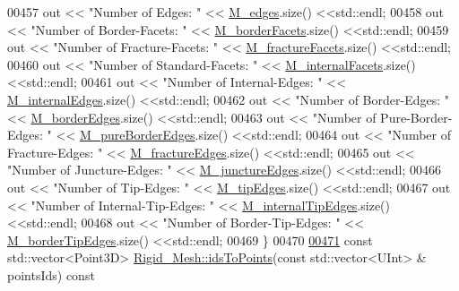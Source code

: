 \begin{DoxyCode}
00457     out << \textcolor{stringliteral}{"Number of Edges: "} << \hyperlink{classFVCode3D_1_1Rigid__Mesh_a4c6287c9256a92c13486048c372fe487}{M\_edges}.size() <<std::endl;
00458     out << \textcolor{stringliteral}{"Number of Border-Facets: "} << \hyperlink{classFVCode3D_1_1Rigid__Mesh_a21700f8c7b816da944a829ee9d3ab7fb}{M\_borderFacets}.size() <<std::endl;
00459     out << \textcolor{stringliteral}{"Number of Fracture-Facets: "} << \hyperlink{classFVCode3D_1_1Rigid__Mesh_acaff9da1f03f04f7012cf372f8f27cd6}{M\_fractureFacets}.size() <<std::endl;
00460     out << \textcolor{stringliteral}{"Number of Standard-Facets: "} << \hyperlink{classFVCode3D_1_1Rigid__Mesh_a8ede7966973fec708327b95fc379a4e1}{M\_internalFacets}.size() <<std::endl;
00461     out << \textcolor{stringliteral}{"Number of Internal-Edges: "} << \hyperlink{classFVCode3D_1_1Rigid__Mesh_a3b689233b2590d76d663195b89d380fb}{M\_internalEdges}.size() <<std::endl;
00462     out << \textcolor{stringliteral}{"Number of Border-Edges: "} << \hyperlink{classFVCode3D_1_1Rigid__Mesh_af9ba7882baec8f8e5e7693a38f3cbc9b}{M\_borderEdges}.size() <<std::endl;
00463     out << \textcolor{stringliteral}{"Number of Pure-Border-Edges: "} << \hyperlink{classFVCode3D_1_1Rigid__Mesh_a72e5bc2acebdc3bca417fa55dfd4c8c0}{M\_pureBorderEdges}.size() <<std::endl;
00464     out << \textcolor{stringliteral}{"Number of Fracture-Edges: "} << \hyperlink{classFVCode3D_1_1Rigid__Mesh_af4626d6b92116a3f6e925847f413da2b}{M\_fractureEdges}.size() <<std::endl;
00465     out << \textcolor{stringliteral}{"Number of Juncture-Edges: "} << \hyperlink{classFVCode3D_1_1Rigid__Mesh_a01850de43f4d5d1dcf617d7697bcf3e8}{M\_junctureEdges}.size() <<std::endl;
00466     out << \textcolor{stringliteral}{"Number of Tip-Edges: "} << \hyperlink{classFVCode3D_1_1Rigid__Mesh_a973940e6cd68e9980afec97fe94a70f4}{M\_tipEdges}.size() <<std::endl;
00467     out << \textcolor{stringliteral}{"Number of Internal-Tip-Edges: "} << \hyperlink{classFVCode3D_1_1Rigid__Mesh_a15cb042bfb5d94c4ce34f20d1e92ebb5}{M\_internalTipEdges}.size() <<std::endl;
00468     out << \textcolor{stringliteral}{"Number of Border-Tip-Edges: "} << \hyperlink{classFVCode3D_1_1Rigid__Mesh_a712ea50f5237025e92af21799c5ec31b}{M\_borderTipEdges}.size() <<std::endl;
00469 \}
00470 
\hypertarget{RigidMesh_8cpp_source.tex_l00471}{}\hyperlink{classFVCode3D_1_1Rigid__Mesh_a38343c767d9f33e3b8affcfb9b17663d}{00471} \textcolor{keyword}{const} std::vector<Point3D> \hyperlink{classFVCode3D_1_1Rigid__Mesh_a38343c767d9f33e3b8affcfb9b17663d}{Rigid\_Mesh::idsToPoints}(\textcolor{keyword}{const} std::vector<UInt> & 
      pointsIds)\textcolor{keyword}{ const}

\end{DoxyCode}
